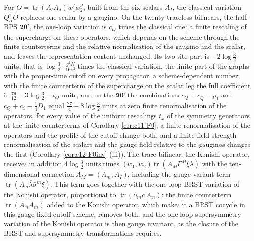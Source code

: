 \begin{remark}
For $O=\operatorname{tr}(A_IA_J)w_1^Iw_2^J$, built from the six scalars $A_I$, the classical variation $Q^i_\alpha O$ replaces one scalar by a gaugino. On the twenty traceless bilinears, the half-BPS $\mathbf{20'}$, the one-loop variation is $c_Q$ times the classical one: a finite rescaling of the supercharge on these operators, which depends on the scheme through the finite counterterms and the relative normalisation of the gaugino and the scalar, and leaves the representation content unchanged. Its two-site part is $-2\log\tfrac32$ units, that is $\log\tfrac32\cdot\frac{g^2N}{16\pi^2}$ times the classical variation, the finite part of the graphs with the proper-time cutoff on every propagator, a scheme-dependent number; with the finite counterterm of the supercharge on the scalar leg the full coefficient is $\tfrac{79}{12}-3\log\tfrac32-t_Q$ units, and on the $\mathbf{20'}$ the combinations $c_Q+c_{\bar Q}-p_1$ and $c_Q+c_S-\tfrac14D_1$ equal $\tfrac{27}4-8\log\tfrac32$ units at zero finite renormalisation of the operators, for every value of the uniform rescalings $t_x$ of the symmetry generators at the finite counterterms of Corollary \ref{cor:c11-F0}; a finite renormalisation of the operators and the profile of the cutoff change both, and a finite field-strength renormalisation of the scalars and the gauge field relative to the gauginos changes the first (Corollary \ref{cor:c12-F0inv} (iii)). The trace bilinear, the Konishi operator, receives in addition $4\log\tfrac32$ units times $(w_1,w_2)\operatorname{tr}(A_M\Gamma^M\xi\lambda)$ with the ten-dimensional connection $A_M=(A_m,A_I)$, including the gauge-variant term $\operatorname{tr}(A_m\bar\lambda\bar\sigma^m\xi)$. This term goes together with the one-loop BRST variation of the Konishi operator, proportional to $\operatorname{tr}(\partial_mc\,A_m)$: the finite counterterm $\operatorname{tr}(A_mA_m)$ added to the Konishi operator, which makes it a BRST cocycle in this gauge-fixed cutoff scheme, removes both, and the one-loop supersymmetry variation of the Konishi operator is then gauge invariant, as the closure of the BRST and supersymmetry transformations requires.
\end{remark}

